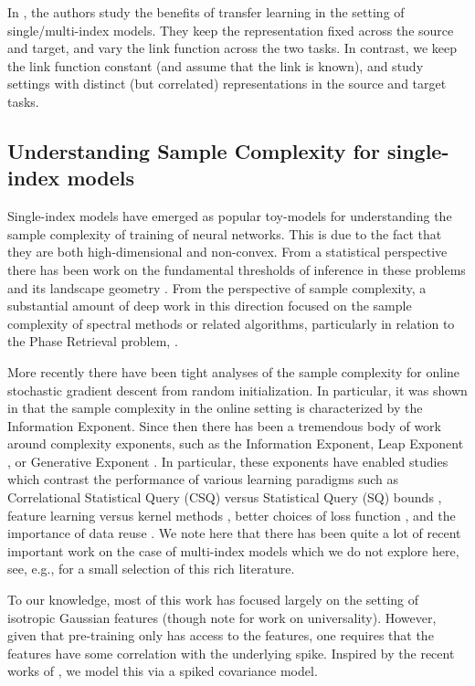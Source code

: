 In \cite{damian2022neural}, the authors study the benefits of transfer learning in the setting of single/multi-index models. They keep the representation fixed across the source and target, and vary the link function across the two tasks. In contrast, we keep the link function constant (and assume that the link is known), and study settings with distinct (but correlated) representations in the source and target tasks. 


\subsection{Understanding Sample Complexity for single-index models}

 Single-index models have emerged as popular toy-models for understanding the sample complexity of training of neural networks. This is due to the fact that they are both high-dimensional and non-convex. From a statistical perspective there has been work on the fundamental thresholds of inference in these problems \cite{barbier2019optimal,maillard2020phase} and its landscape geometry \cite{sun2018geometric,maillard2019landscape,dudeja2018learning}. From the perspective of sample complexity, a substantial amount of deep work in this direction focused on the sample complexity  of spectral methods or related algorithms, particularly in relation to the Phase Retrieval problem, \cite{candes2015phase,barbier2019optimal, lu2020phase}.  


More recently there have been tight analyses of the sample complexity for online stochastic gradient descent from random initialization.
In particular, it was shown in \cite{arous2021online} that the sample complexity in the online setting is characterized by the Information Exponent. Since then there has been a tremendous body of work around complexity exponents, such as the Information Exponent, Leap Exponent \cite{abbe2023sgd}, or Generative Exponent \cite{damian2024computational}. In particular, these exponents have enabled studies which contrast the performance of various learning paradigms such as Correlational Statistical Query (CSQ) versus Statistical Query (SQ) bounds \cite{damian2024computational}, feature learning versus kernel methods \cite{ba2024learning}, better choices of loss function \cite{damian2024smoothing}, and the importance of data reuse \cite{dandi2024benefits,lee2024neural}.  We note here that there has been quite a lot of recent important work on the case of multi-index models which we do not explore here, see, e.g., \cite{abbe2023sgd,bietti2023learning,ren2024learning} for a small selection of this rich literature.  


To our knowledge, most of this work has focused largely on the setting of isotropic Gaussian features (though note \cite{zweig2024single} for work on universality). However, given that pre-training only has access to the features, one requires that the features have some correlation with the underlying spike. Inspired by the recent works of \cite{mousavi2023gradient, ba2024learning}, we model this via a spiked covariance model.